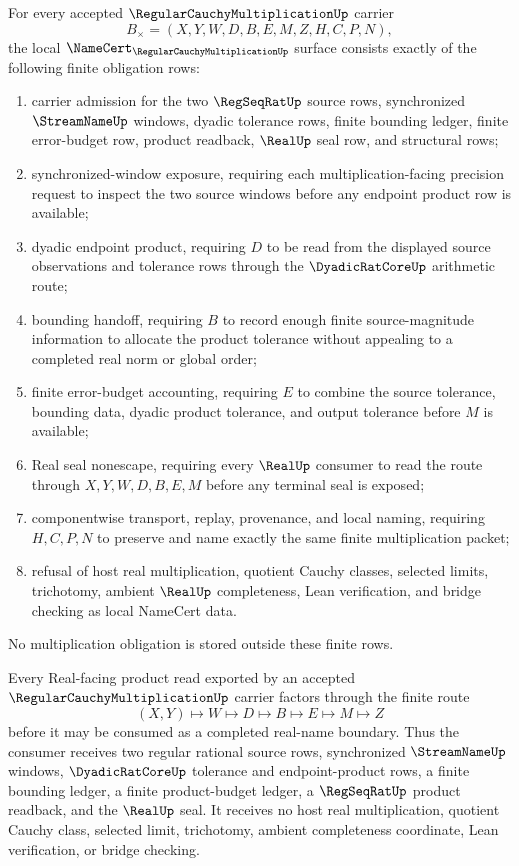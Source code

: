 \begin{theorem}
\label{thm:regular-cauchy-multiplication-namecert-obligations}
For every accepted $\RegularCauchyMultiplicationUp$ carrier
$$
B_\times=(X,Y,W,D,B,E,M,Z,H,C,P,N),
$$
the local $\NameCert_{\RegularCauchyMultiplicationUp}$ surface consists exactly of the following finite obligation rows:
\begin{enumerate}
\item carrier admission for the two $\RegSeqRatUp$ source rows, synchronized $\StreamNameUp$ windows, dyadic tolerance rows, finite bounding ledger, finite error-budget row, product readback, $\RealUp$ seal row, and structural rows;
\item synchronized-window exposure, requiring each multiplication-facing precision request to inspect the two source windows before any endpoint product row is available;
\item dyadic endpoint product, requiring $D$ to be read from the displayed source observations and tolerance rows through the $\DyadicRatCoreUp$ arithmetic route;
\item bounding handoff, requiring $B$ to record enough finite source-magnitude information to allocate the product tolerance without appealing to a completed real norm or global order;
\item finite error-budget accounting, requiring $E$ to combine the source tolerance, bounding data, dyadic product tolerance, and output tolerance before $M$ is available;
\item Real seal nonescape, requiring every $\RealUp$ consumer to read the route through $X,Y,W,D,B,E,M$ before any terminal seal is exposed;
\item componentwise transport, replay, provenance, and local naming, requiring $H,C,P,N$ to preserve and name exactly the same finite multiplication packet;
\item refusal of host real multiplication, quotient Cauchy classes, selected limits, trichotomy, ambient $\RealUp$ completeness, Lean verification, and bridge checking as local NameCert data.
\end{enumerate}
No multiplication obligation is stored outside these finite rows.
\end{theorem}

\begin{theorem}
\label{thm:regular-cauchy-multiplication-real-seal-handoff}
Every Real-facing product read exported by an accepted $\RegularCauchyMultiplicationUp$ carrier factors through the finite route
$$
(X,Y)\longmapsto W\longmapsto D\longmapsto B\longmapsto E\longmapsto M\longmapsto Z
$$
before it may be consumed as a completed real-name boundary. Thus the consumer receives two regular rational source rows, synchronized $\StreamNameUp$ windows, $\DyadicRatCoreUp$ tolerance and endpoint-product rows, a finite bounding ledger, a finite product-budget ledger, a $\RegSeqRatUp$ product readback, and the $\RealUp$ seal. It receives no host real multiplication, quotient Cauchy class, selected limit, trichotomy, ambient completeness coordinate, Lean verification, or bridge checking.
\end{theorem}

